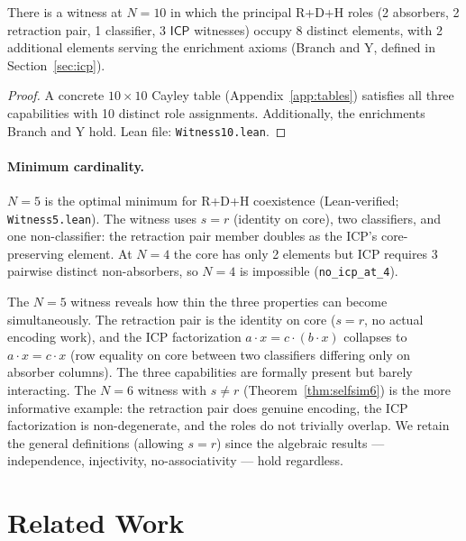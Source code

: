 \documentclass[sigconf,screen,review,anonymous]{acmart}
\newcommand{\dotop}{\cdot}
\newcommand{\ICP}{\textsf{ICP}}
\theoremstyle{remark}
\begin{document}
\begin{proposition}
\label{thm:separated}
There is a witness at $N\!=\!10$ in which the principal R+D+H roles (2 absorbers, 2 retraction pair, 1 classifier, 3 $\ICP$ witnesses) occupy 8 distinct elements, with 2 additional elements serving the enrichment axioms (Branch and Y, defined in Section~\ref{sec:icp}).
\end{proposition}

\begin{proof}
A concrete $10 \times 10$ Cayley table (Appendix~\ref{app:tables}) satisfies all three capabilities with 10 distinct role assignments. Additionally, the enrichments Branch and Y hold. Lean file: \texttt{Witness10.lean}.
\end{proof}

\paragraph{Minimum cardinality.}
$N\!=\!5$ is the optimal minimum for R+D+H coexistence (Lean-verified; \texttt{Witness5.lean}). The witness uses $s = r$ (identity on core), two classifiers, and one non-classifier: the retraction pair member doubles as the ICP's core-preserving element. At $N\!=\!4$ the core has only 2 elements but ICP requires 3 pairwise distinct non-absorbers, so $N\!=\!4$ is impossible (\texttt{no\_icp\_at\_4}).

The $N\!=\!5$ witness reveals how thin the three properties can become simultaneously. The retraction pair is the identity on core ($s = r$, no actual encoding work), and the ICP factorization $a \dotop x = c \dotop (b \dotop x)$ collapses to $a \dotop x = c \dotop x$ (row equality on core between two classifiers differing only on absorber columns). The three capabilities are formally present but barely interacting. The $N\!=\!6$ witness with $s \neq r$ (Theorem~\ref{thm:selfsim6}) is the more informative example: the retraction pair does genuine encoding, the ICP factorization is non-degenerate, and the roles do not trivially overlap. We retain the general definitions (allowing $s = r$) since the algebraic results --- independence, injectivity, no-associativity --- hold regardless.

\section{Related Work}
\label{sec:related}
\end{document}
